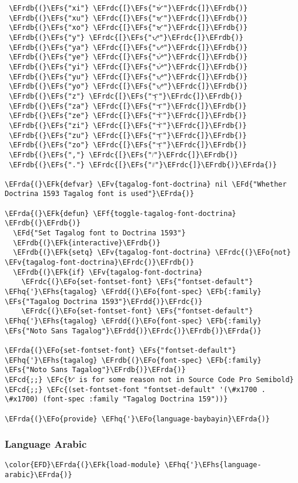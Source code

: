 \documentclass[a4wide,10pt]{article}
\newcommand{\EFc}[1]{\textcolor{EFc}{#1}} %
\newcommand{\EFcd}[1]{\textcolor{EFcd}{#1}} %
\newcommand{\EFs}[1]{\textcolor{EFs}{#1}} %
\newcommand{\EFd}[1]{\textcolor{EFd}{#1}} %
\newcommand{\EFk}[1]{\textcolor{EFk}{#1}} %
\newcommand{\EFb}[1]{\textcolor{EFb}{#1}} %
\newcommand{\EFf}[1]{\textcolor{EFf}{#1}} %
\newcommand{\EFv}[1]{\textcolor{EFv}{#1}} %
\newcommand{\EFo}[1]{\textcolor{EFo}{#1}} %
\newcommand{\EFhq}[1]{\textcolor{EFhq}{#1}} %
\newcommand{\EFhs}[1]{\textcolor{EFhs}{#1}} %
\newcommand{\EFrda}[1]{\textcolor{EFrda}{#1}} %
\newcommand{\EFrdb}[1]{\textcolor{EFrdb}{#1}} %
\newcommand{\EFrdc}[1]{\textcolor{EFrdc}{#1}} %
\newcommand{\EFrdd}[1]{\textcolor{EFrdd}{#1}} %
\begin{document}
\begin{Code}
\begin{Verbatim}
 \EFrdb{(}\EFs{"xi"} \EFrdc{[}\EFs{"ᜋᜒ"}\EFrdc{]}\EFrdb{)}
 \EFrdb{(}\EFs{"xu"} \EFrdc{[}\EFs{"ᜋᜓ"}\EFrdc{]}\EFrdb{)}
 \EFrdb{(}\EFs{"xo"} \EFrdc{[}\EFs{"ᜋᜓ"}\EFrdc{]}\EFrdb{)}
 \EFrdb{(}\EFs{"y"} \EFrdc{[}\EFs{"ᜌ᜔"}\EFrdc{]}\EFrdb{)}
 \EFrdb{(}\EFs{"ya"} \EFrdc{[}\EFs{"ᜌ"}\EFrdc{]}\EFrdb{)}
 \EFrdb{(}\EFs{"ye"} \EFrdc{[}\EFs{"ᜌᜒ"}\EFrdc{]}\EFrdb{)}
 \EFrdb{(}\EFs{"yi"} \EFrdc{[}\EFs{"ᜌᜒ"}\EFrdc{]}\EFrdb{)}
 \EFrdb{(}\EFs{"yu"} \EFrdc{[}\EFs{"ᜌᜓ"}\EFrdc{]}\EFrdb{)}
 \EFrdb{(}\EFs{"yo"} \EFrdc{[}\EFs{"ᜌᜓ"}\EFrdc{]}\EFrdb{)}
 \EFrdb{(}\EFs{"z"} \EFrdc{[}\EFs{"ᜎ᜔"}\EFrdc{]}\EFrdb{)}
 \EFrdb{(}\EFs{"za"} \EFrdc{[}\EFs{"ᜎ"}\EFrdc{]}\EFrdb{)}
 \EFrdb{(}\EFs{"ze"} \EFrdc{[}\EFs{"ᜎᜒ"}\EFrdc{]}\EFrdb{)}
 \EFrdb{(}\EFs{"zi"} \EFrdc{[}\EFs{"ᜎᜒ"}\EFrdc{]}\EFrdb{)}
 \EFrdb{(}\EFs{"zu"} \EFrdc{[}\EFs{"ᜎᜓ"}\EFrdc{]}\EFrdb{)}
 \EFrdb{(}\EFs{"zo"} \EFrdc{[}\EFs{"ᜎᜓ"}\EFrdc{]}\EFrdb{)}
 \EFrdb{(}\EFs{","} \EFrdc{[}\EFs{"᜵"}\EFrdc{]}\EFrdb{)}
 \EFrdb{(}\EFs{"."} \EFrdc{[}\EFs{"᜶"}\EFrdc{]}\EFrdb{)}\EFrda{)}

\EFrda{(}\EFk{defvar} \EFv{tagalog-font-doctrina} nil \EFd{"Whether Doctrina 1593 Tagalog font is used"}\EFrda{)}

\EFrda{(}\EFk{defun} \EFf{toggle-tagalog-font-doctrina} \EFrdb{(}\EFrdb{)}
  \EFd{"Set Tagalog font to Doctrina 1593"}
  \EFrdb{(}\EFk{interactive}\EFrdb{)}
  \EFrdb{(}\EFk{setq} \EFv{tagalog-font-doctrina} \EFrdc{(}\EFo{not} \EFv{tagalog-font-doctrina}\EFrdc{)}\EFrdb{)}
  \EFrdb{(}\EFk{if} \EFv{tagalog-font-doctrina}
    \EFrdc{(}\EFo{set-fontset-font} \EFs{"fontset-default"} \EFhq{'}\EFhs{tagalog} \EFrdd{(}\EFo{font-spec} \EFb{:family} \EFs{"Tagalog Doctrina 1593"}\EFrdd{)}\EFrdc{)}
    \EFrdc{(}\EFo{set-fontset-font} \EFs{"fontset-default"} \EFhq{'}\EFhs{tagalog} \EFrdd{(}\EFo{font-spec} \EFb{:family} \EFs{"Noto Sans Tagalog"}\EFrdd{)}\EFrdc{)}\EFrdb{)}\EFrda{)}

\EFrda{(}\EFo{set-fontset-font} \EFs{"fontset-default"} \EFhq{'}\EFhs{tagalog} \EFrdb{(}\EFo{font-spec} \EFb{:family} \EFs{"Noto Sans Tagalog"}\EFrdb{)}\EFrda{)}
\EFcd{;;} \EFc{ᜀ is for some reason not in Source Code Pro Semibold}
\EFcd{;;} \EFc{(set-fontset-font "fontset-default" '(\#x1700 . \#x1700) (font-spec :family "Tagalog Doctrina 159"))}

\EFrda{(}\EFo{provide} \EFhq{'}\EFo{language-baybayin}\EFrda{)}
\end{Verbatim}
\end{Code}
\subsubsection{Language Arabic}
\label{sec:org2031213}
\begin{Code}
\begin{Verbatim}
\color{EFD}\EFrda{(}\EFk{load-module} \EFhq{'}\EFhs{language-arabic}\EFrda{)}
\end{Verbatim}
\end{Code}
\end{document}
